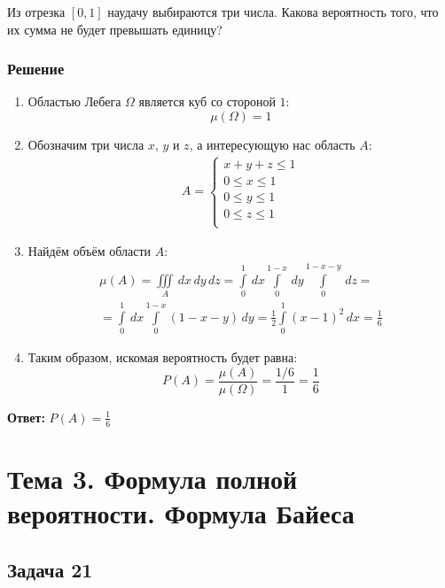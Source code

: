 \documentclass[14pt]{article}
\begin{document}
    Из отрезка $[0,1]$ наудачу выбираются три числа.
    Какова вероятность того, что их сумма не будет превышать единицу?

    \subsubsection*{Решение}
    \begin{enumerate}[wide, labelwidth=!, labelindent=0pt]
        \item Областью Лебега $\Omega$ является куб со стороной $1$:
        \[\mu(\Omega) = 1\]
        \item Обозначим три числа $x$, $y$ и $z$, а интересующую нас область $A$:
        \begin{gather*}
            A =
            \begin{cases}
                x + y + z \leq 1 \\
                0 \leq x \leq 1 \\
                0 \leq y \leq 1 \\
                0 \leq z \leq 1 \\
            \end{cases}
        \end{gather*}
        \item Найдём объём области $A$:
        \begin{gather*}
            \mu(A) = \iiint \limits_{A} \,dx \, dy \, dz =  \int \limits_0^1 \, dx \int \limits_0^{1 - x} \, dy \int \limits_0^{1 - x - y} \, dz = \\
            = \int \limits_0^1 \, dx \int \limits_0^{1 - x} (1 - x - y) \, dy = \frac{1}{2} \int \limits_0^1  (x - 1)^2 \, dx = \frac{1}{6}
        \end{gather*}
        \item Таким образом, искомая вероятность будет равна:
        \[P(A) = \frac{\mu(A)}{\mu(\Omega)} = \frac{1/6}{1} = \frac{1}{6}\]
    \end{enumerate}
    \hspace{290pt}\textbf{Ответ:} $P(A) = \frac{1}{6}$

    \newpage

    \section*{Тема 3. Формула полной вероятности. Формула Байеса}

    \subsection*{Задача 21}
\end{document}
